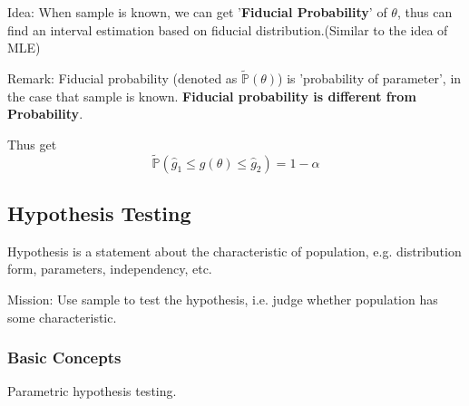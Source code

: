     Idea: When sample is known, we can get '\textbf{Fiducial Probability}' of $\theta$, thus can find an interval estimation based on fiducial distribution.(Similar to the idea of MLE)

    Remark: Fiducial probability (denoted as $\tilde{\mathbb{P}}(\theta)$) is 'probability of parameter', in the case that sample is known. \textbf{Fiducial probability is different from Probability}.

    Thus get
    \begin{equation}
        \tilde{\mathbb{P}}(\hat{g}_1\leq g(\theta)\leq \hat{g}_2)=1-\alpha
    \end{equation}







\subsection{Hypothesis Testing}\label{SectionHypothesisTesting}
    Hypothesis is a statement about the characteristic of population, e.g. distribution form, parameters, independency, etc. 
    
    Mission: Use sample to test the hypothesis, i.e. judge whether population has some characteristic.

\subsubsection{Basic Concepts}\label{SubSectionHypothesisTestingBasicConcepts}
    Parametric hypothesis testing.

